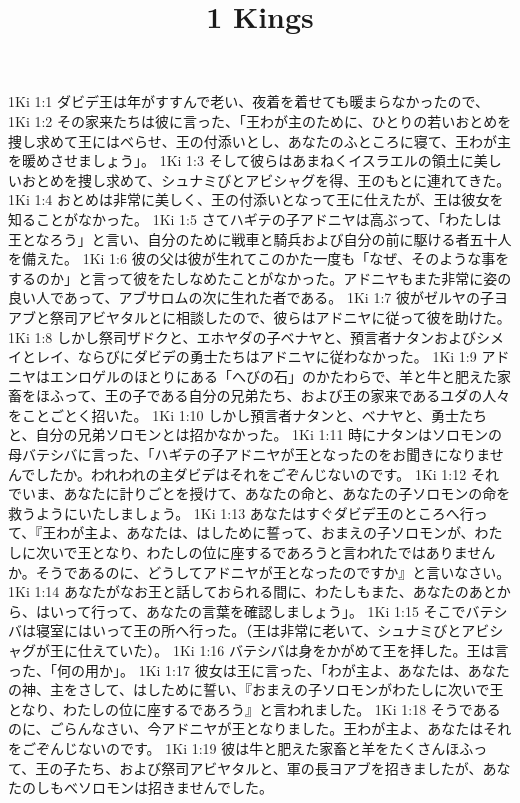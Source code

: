 

\title{1 Kings}

1Ki 1:1  ダビデ王は年がすすんで老い、夜着を着せても暖まらなかったので、
1Ki 1:2  その家来たちは彼に言った、「王わが主のために、ひとりの若いおとめを捜し求めて王にはべらせ、王の付添いとし、あなたのふところに寝て、王わが主を暖めさせましょう」。
1Ki 1:3  そして彼らはあまねくイスラエルの領土に美しいおとめを捜し求めて、シュナミびとアビシャグを得、王のもとに連れてきた。
1Ki 1:4  おとめは非常に美しく、王の付添いとなって王に仕えたが、王は彼女を知ることがなかった。
1Ki 1:5  さてハギテの子アドニヤは高ぶって、「わたしは王となろう」と言い、自分のために戦車と騎兵および自分の前に駆ける者五十人を備えた。
1Ki 1:6  彼の父は彼が生れてこのかた一度も「なぜ、そのような事をするのか」と言って彼をたしなめたことがなかった。アドニヤもまた非常に姿の良い人であって、アブサロムの次に生れた者である。
1Ki 1:7  彼がゼルヤの子ヨアブと祭司アビヤタルとに相談したので、彼らはアドニヤに従って彼を助けた。
1Ki 1:8  しかし祭司ザドクと、エホヤダの子ベナヤと、預言者ナタンおよびシメイとレイ、ならびにダビデの勇士たちはアドニヤに従わなかった。
1Ki 1:9  アドニヤはエンロゲルのほとりにある「へびの石」のかたわらで、羊と牛と肥えた家畜をほふって、王の子である自分の兄弟たち、および王の家来であるユダの人々をことごとく招いた。
1Ki 1:10  しかし預言者ナタンと、ベナヤと、勇士たちと、自分の兄弟ソロモンとは招かなかった。
1Ki 1:11  時にナタンはソロモンの母バテシバに言った、「ハギテの子アドニヤが王となったのをお聞きになりませんでしたか。われわれの主ダビデはそれをごぞんじないのです。
1Ki 1:12  それでいま、あなたに計りごとを授けて、あなたの命と、あなたの子ソロモンの命を救うようにいたしましょう。
1Ki 1:13  あなたはすぐダビデ王のところへ行って、『王わが主よ、あなたは、はしために誓って、おまえの子ソロモンが、わたしに次いで王となり、わたしの位に座するであろうと言われたではありませんか。そうであるのに、どうしてアドニヤが王となったのですか』と言いなさい。
1Ki 1:14  あなたがなお王と話しておられる間に、わたしもまた、あなたのあとから、はいって行って、あなたの言葉を確認しましょう」。
1Ki 1:15  そこでバテシバは寝室にはいって王の所へ行った。（王は非常に老いて、シュナミびとアビシャグが王に仕えていた）。
1Ki 1:16  バテシバは身をかがめて王を拝した。王は言った、「何の用か」。
1Ki 1:17  彼女は王に言った、「わが主よ、あなたは、あなたの神、主をさして、はしために誓い、『おまえの子ソロモンがわたしに次いで王となり、わたしの位に座するであろう』と言われました。
1Ki 1:18  そうであるのに、ごらんなさい、今アドニヤが王となりました。王わが主よ、あなたはそれをごぞんじないのです。
1Ki 1:19  彼は牛と肥えた家畜と羊をたくさんほふって、王の子たち、および祭司アビヤタルと、軍の長ヨアブを招きましたが、あなたのしもべソロモンは招きませんでした。
